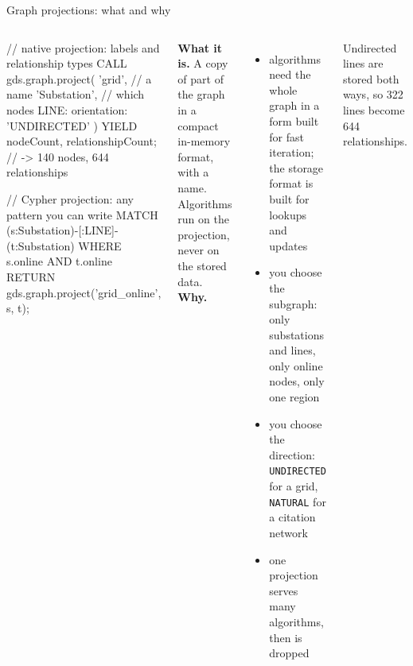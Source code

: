 \documentclass[aspectratio=169, 10pt]{beamer}
\newcommand{\kicker}[1]{{\color{muted}\small #1}}
\begin{document}
\begin{frame}[fragile]{Graph projections: what and why}
  \vspace{0.1cm}
  \begin{columns}[T]
      \begin{code}
// native projection: labels and relationship types
CALL gds.graph.project(
  'grid',                      // a name
  'Substation',                // which nodes
  { LINE: { orientation: 'UNDIRECTED' } }
)
YIELD nodeCount, relationshipCount;
// -> 140 nodes, 644 relationships

// Cypher projection: any pattern you can write
MATCH (s:Substation)-[:LINE]-(t:Substation)
WHERE s.online AND t.online
RETURN gds.graph.project('grid_online', s, t);
      \end{code}
      \small
      \textbf{What it is.} A copy of part of the graph in a compact in-memory format, with a name. Algorithms run on the projection, never on the stored data.\\[4pt]
      \textbf{Why.}
      \begin{itemize}
        \item algorithms need the whole graph in a form built for fast iteration; the storage format is built for lookups and updates
        \item you choose the subgraph: only substations and lines, only online nodes, only one region
        \item you choose the direction: \texttt{UNDIRECTED} for a grid, \texttt{NATURAL} for a citation network
        \item one projection serves many algorithms, then is dropped
      \end{itemize}
      \kicker{Undirected lines are stored both ways, so 322 lines become 644 relationships.}
  \end{columns}
\end{frame}
\end{document}

